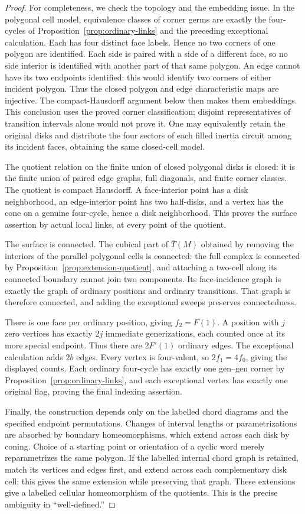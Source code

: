 \documentclass[11pt]{article}
\theoremstyle{definition}\newtheorem{definition}[theorem]{Definition}
\begin{document}
\begin{proof}
For completeness, we check the topology and the embedding issue.
In the polygonal cell model, equivalence classes of corner germs
are exactly the four-cycles of Proposition~\ref{prop:ordinary-links}
and the preceding exceptional calculation. Each has four distinct
face labels. Hence no two corners of one polygon are identified.
Each side is paired with a side of a different face, so no side
interior is identified with another part of that same polygon.
An edge cannot have its two endpoints identified: this would identify
two corners of either incident polygon. Thus the closed polygon and
edge characteristic maps are injective. The compact-Hausdorff
argument below then makes them embeddings. This conclusion uses the
proved corner classification; disjoint representatives of transition
intervals alone would not prove it. One may equivalently retain the
original disks and distribute the four sectors of each filled inertia
circuit among its incident faces, obtaining the same closed-cell model.

The quotient relation on the finite union of closed polygonal disks is
closed: it is the finite union of paired edge graphs, full diagonals,
and finite corner classes. The quotient is compact Hausdorff.
A face-interior point has a disk neighborhood, an edge-interior point
has two half-disks, and a vertex has the cone on a genuine four-cycle,
hence a disk neighborhood. This proves the surface assertion by actual
local links, at every point of the quotient.

The surface is connected. The cubical part of $\overline T(M)$ obtained by
removing the interiors of the parallel polygonal cells is connected:
the full complex is connected by Proposition~\ref{prop:extension-quotient}, and attaching a two-cell along
its connected boundary cannot join two components. Its face-incidence
graph is exactly the graph of ordinary positions and ordinary
transitions. That graph is therefore connected, and adding the
exceptional sweeps preserves connectedness.

There is one face per ordinary position, giving $f_2=F(1)$. A position
with $j$ zero vertices has exactly $2j$ immediate generizations,
each counted once at its more special endpoint. Thus there are
$2F'(1)$ ordinary edges. The exceptional calculation adds $2b$ edges.
Every vertex is four-valent, so $2f_1=4f_0$, giving the displayed
counts. Each ordinary four-cycle has exactly one gen--gen corner by
Proposition~\ref{prop:ordinary-links}, and each exceptional vertex has exactly one original flag, proving
the final indexing assertion.

Finally, the construction depends only on the labelled chord diagrams
and the specified endpoint permutations. Changes of interval lengths
or parametrizations are absorbed by boundary homeomorphisms, which
extend across each disk by coning. Choice of a starting point or
orientation of a cyclic word merely reparametrizes the same polygon.
If the labelled internal chord graph is retained, match its vertices
and edges first, and extend across each complementary disk cell;
this gives the same extension while preserving that graph. These
extensions give a labelled cellular homeomorphism of the quotients.
This is the precise ambiguity in ``well-defined.''
\end{proof}
\end{document}
